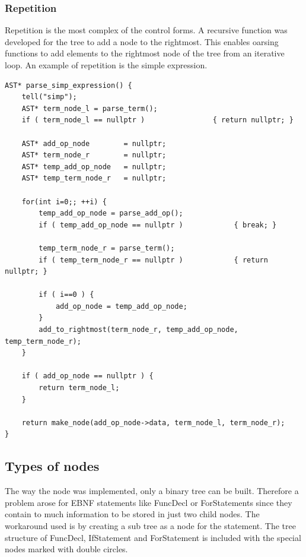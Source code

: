 \documentclass[a4paper, 12pt]{article}
\begin{document}
\subsubsection{Repetition}
Repetition is the most complex of the control forms. A recursive function was developed for the tree to add a node to the rightmost.
This enables oarsing functions to add elements to the rightmost node of the tree from an iterative loop.
An example of repetition is the simple expression.

\begin{lstlisting}[caption="Repetition example"]
AST* parse_simp_expression() {
    tell("simp");
    AST* term_node_l = parse_term();
    if ( term_node_l == nullptr )                { return nullptr; }

    AST* add_op_node        = nullptr;
    AST* term_node_r        = nullptr;
    AST* temp_add_op_node   = nullptr;
    AST* temp_term_node_r   = nullptr;

    for(int i=0;; ++i) {
        temp_add_op_node = parse_add_op();
        if ( temp_add_op_node == nullptr )            { break; }

        temp_term_node_r = parse_term();
        if ( temp_term_node_r == nullptr )            { return nullptr; }

        if ( i==0 ) {
            add_op_node = temp_add_op_node;
        }
        add_to_rightmost(term_node_r, temp_add_op_node, temp_term_node_r);
    }

    if ( add_op_node == nullptr ) {
        return term_node_l;
    }

    return make_node(add_op_node->data, term_node_l, term_node_r);
}
\end{lstlisting}

\subsection{Types of nodes}
The way the node was implemented, only a binary tree can be built. Therefore a problem arose for EBNF statements like FuncDecl 
or ForStatements since they contain to much information to be stored in just two child nodes. The workaround used is by creating
a sub tree as a node for the statement. The tree structure of FuncDecl, IfStatement and ForStatement is included with the special nodes
marked with double circles.
\end{document}
